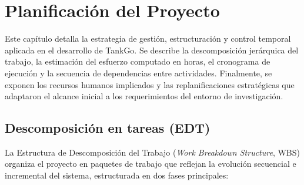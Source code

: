 
\chapter{Planificación del Proyecto}

Este capítulo detalla la estrategia de gestión, estructuración y control temporal aplicada en 
el desarrollo de TankGo. Se describe la descomposición jerárquica del trabajo, la estimación 
del esfuerzo computado en horas, el cronograma de ejecución y la secuencia de dependencias entre actividades. 
Finalmente, se exponen los recursos humanos implicados y las replanificaciones estratégicas que adaptaron el 
alcance inicial a los requerimientos del entorno de investigación.

\section{Descomposición en tareas (EDT)}

La Estructura de Descomposición del Trabajo (\textit{Work Breakdown Structure}, WBS) organiza el 
proyecto en paquetes de trabajo que reflejan la evolución secuencial e incremental del
sistema, estructurada en dos fases principales:

